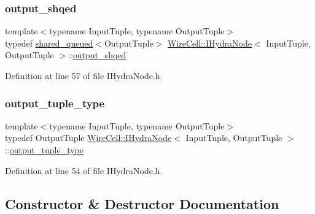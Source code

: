 \subsubsection{\texorpdfstring{output\+\_\+shqed}{output\_shqed}}
{\footnotesize\ttfamily template$<$typename Input\+Tuple, typename Output\+Tuple$>$ \\
typedef \hyperlink{struct_wire_cell_1_1shared__queued}{shared\+\_\+queued}$<$Output\+Tuple$>$ \hyperlink{class_wire_cell_1_1_i_hydra_node}{Wire\+Cell\+::\+I\+Hydra\+Node}$<$ Input\+Tuple, Output\+Tuple $>$\+::\hyperlink{class_wire_cell_1_1_i_hydra_node_abc72640e56a315146c504610302b1d8d}{output\+\_\+shqed}}



Definition at line 57 of file I\+Hydra\+Node.\+h.

\mbox{\label{class_wire_cell_1_1_i_hydra_node_a7f47cf3a305447014381fed36e71a26c}} 
\subsubsection{\texorpdfstring{output\+\_\+tuple\+\_\+type}{output\_tuple\_type}}
{\footnotesize\ttfamily template$<$typename Input\+Tuple, typename Output\+Tuple$>$ \\
typedef Output\+Tuple \hyperlink{class_wire_cell_1_1_i_hydra_node}{Wire\+Cell\+::\+I\+Hydra\+Node}$<$ Input\+Tuple, Output\+Tuple $>$\+::\hyperlink{class_wire_cell_1_1_i_hydra_node_a7f47cf3a305447014381fed36e71a26c}{output\+\_\+tuple\+\_\+type}}



Definition at line 54 of file I\+Hydra\+Node.\+h.



\subsection{Constructor \& Destructor Documentation}
\mbox{\label{class_wire_cell_1_1_i_hydra_node_a94d501d7811fe97af9408cb539ef967b}} 
